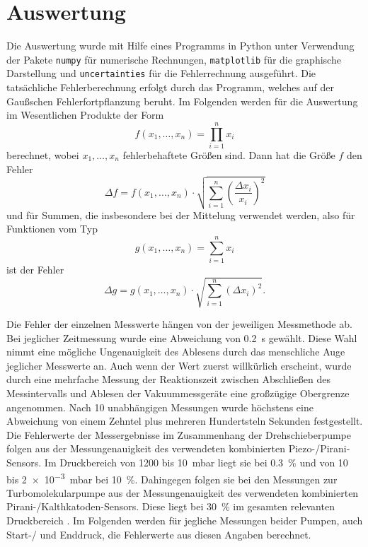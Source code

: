 \section{Auswertung}
\label{sec:Auswertung}

Die Auswertung wurde mit Hilfe eines Programms in Python unter Verwendung der Pakete \texttt{numpy}\cite{numpy} für numerische Rechnungen,
 \texttt{matplotlib}\cite{matplotlib} für die graphische Darstellung und \texttt{uncertainties}\cite{uncertainties} für die Fehlerrechnung ausgeführt.
Die tatsächliche Fehlerberechnung erfolgt durch das Programm, welches auf der Gaußschen Fehlerfortpflanzung beruht.
Im Folgenden werden für die Auswertung im Wesentlichen Produkte der Form
\begin{equation*}
  f(x_1,\ldots,x_n) = \prod_{i=1}^n x_i
\end{equation*}
berechnet, wobei $x_1,\ldots,x_n$ fehlerbehaftete Größen sind.
Dann hat die Größe $f$ den Fehler
\begin{equation*}
  \Delta f = f(x_1,\ldots,x_n) \cdot \sqrt{\sum_{i=1}^n \left(\frac{\Delta x_i}{x_i}\right)^2}
\end{equation*}
und für Summen, die insbesondere bei der Mittelung verwendet werden, also für Funktionen vom Typ
\begin{equation*}
  g(x_1,\ldots,x_n) = \sum_{i=1}^n x_i
\end{equation*}
ist der Fehler
\begin{equation}
  \Delta g = g(x_1,\ldots,x_n) \cdot \sqrt{\sum_{i=1}^n \left(\Delta x_i\right)^2}.
  \label{eq:fehlerDesMittelwertes}
\end{equation}

Die Fehler der einzelnen Messwerte hängen von der jeweiligen Messmethode ab.
Bei jeglicher Zeitmessung wurde eine Abweichung von \qty{0.2}{\second} gewählt.
Diese Wahl nimmt eine mögliche Ungenauigkeit des Ablesens durch das menschliche Auge jeglicher Messwerte an.
Auch wenn der Wert zuerst willkürlich erscheint, wurde durch eine mehrfache Messung der Reaktionszeit zwischen Abschließen des Messintervalls und
Ablesen der Vakuummessgeräte eine großzügige Obergrenze angenommen. Nach 10 unabhängigen Messungen wurde höchstens eine Abweichung von einem Zehntel plus mehreren Hundertsteln Sekunden festgestellt.
Die Fehlerwerte der Messergebnisse im Zusammenhang der Drehschieberpumpe folgen aus der Messungenauigkeit des verwendeten kombinierten Piezo-/Pirani-Sensors.
Im Druckbereich von \num{1200} bis \qty{10}{\milli\bar} liegt sie bei \qty{0.3}{\percent} und von \num{10} bis \qty{2e-3}{\milli\bar} bei \qty{10}{\percent}\cite{sample}.
Dahingegen folgen sie bei den Messungen zur Turbomolekularpumpe aus der Messungenauigkeit des verwendeten kombinierten Pirani-/Kalthkatoden-Sensors.
Diese liegt bei \qty{30}{\percent} im gesamten relevanten Druckbereich \cite{sample}.
Im Folgenden werden für jegliche Messungen beider Pumpen, auch Start-/ und Enddruck, die Fehlerwerte aus diesen Angaben berechnet.

